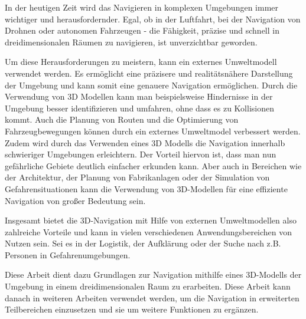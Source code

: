 

In der heutigen Zeit wird das Navigieren in komplexen Umgebungen immer wichtiger und herausfordernder. Egal, ob in der Luftfahrt, bei der Navigation von Drohnen oder autonomen Fahrzeugen - die Fähigkeit, präzise und schnell in dreidimensionalen Räumen zu navigieren, ist unverzichtbar geworden.

Um diese Herausforderungen zu meistern, kann ein externes Umweltmodell verwendet werden. Es ermöglicht eine präzisere und realitätsnähere Darstellung der Umgebung und kann somit eine genauere Navigation ermöglichen. Durch die Verwendung von 3D Modellen kann man beispielsweise Hindernisse in der Umgebung besser identifizieren und umfahren, ohne dass es zu Kollisionen kommt. Auch die Planung von Routen und die Optimierung von Fahrzeugbewegungen können durch ein externes Umweltmodel verbessert werden. Zudem wird durch das Verwenden eines 3D Modells die Navigation innerhalb schwieriger Umgebungen erleichtern. Der Vorteil hiervon ist, dass man nun gefährliche Gebiete deutlich einfacher erkunden kann. Aber auch in Bereichen wie der Architektur, der Planung von Fabrikanlagen oder der Simulation von Gefahrensituationen kann die Verwendung von 3D-Modellen für eine effiziente Navigation von großer Bedeutung sein.

Insgesamt bietet die 3D-Navigation mit Hilfe von externen Umweltmodellen also zahlreiche Vorteile und kann in vielen verschiedenen Anwendungsbereichen von Nutzen sein. Sei es in der Logistik, der Aufklärung oder der Suche nach z.B. Personen in Gefahrenumgebungen.

Diese Arbeit dient dazu Grundlagen zur Navigation mithilfe eines 3D-Modells der Umgebung in einem dreidimensionalen Raum zu erarbeiten. Diese Arbeit kann danach in weiteren Arbeiten verwendet werden, um die Navigation in erweiterten Teilbereichen einzusetzen und sie um weitere Funktionen zu ergänzen.

